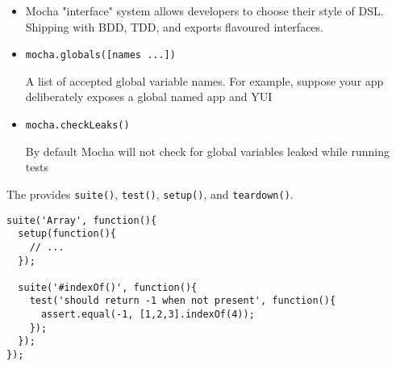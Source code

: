 \begin{itemize}
\item
Mocha "interface" system allows developers to choose their style of
DSL. Shipping with BDD, TDD, and exports flavoured interfaces.
\item
\verb|mocha.globals([names ...])|

A list of accepted global variable names. For example, suppose your app deliberately exposes a global named app and YUI

\item
\verb|mocha.checkLeaks()|

By default Mocha will not check for global variables leaked while running tests
\end{itemize}



The  provides \verb|suite()|, \verb|test()|, \verb|setup()|, and \verb|teardown()|.

\begin{verbatim}
suite('Array', function(){
  setup(function(){
    // ...
  });

  suite('#indexOf()', function(){
    test('should return -1 when not present', function(){
      assert.equal(-1, [1,2,3].indexOf(4));
    });
  });
});
\end{verbatim}


